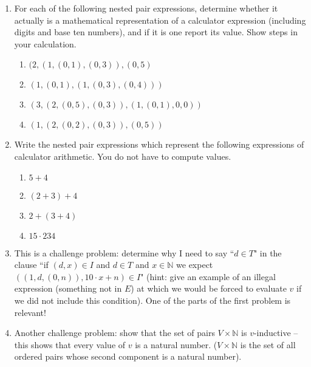 \documentclass[12pt]{book}
\begin{document}
\begin{description}
\begin{enumerate}

\item  For each of the following nested pair expressions, determine whether it actually is a mathematical representation of a calculator expression (including digits and base ten numbers), and if it is one report its value.
Show steps in your calculation.

\begin{enumerate}

\item  $(2,(1,(0,1),(0,3)),(0,5)$

\item  $(1,(0,1),(1,(0,3),(0,4)))$

\item  $(3,(2,(0,5),(0,3)),(1,(0,1),0,0))$

\item   $(1,(2,(0,2),(0,3)),(0,5))$


\end{enumerate}

\item Write the nested pair expressions which represent  the following expressions of calculator arithmetic.  You do not have to compute values.

\begin{enumerate}

\item $5+4$

\item $(2+3)+4$

\item $2+(3+4)$

\item $15 \cdot 234$


\end{enumerate}

\item This is a challenge problem:  determine why I need to say ``$d \in T$" in the clause ``if $(d,x) \in I$ and $d \in T$ and $x \in {\mathbb N}$ we expect $((1,d,(0,n)),10\cdot x+n) \in I$"
(hint:  give an example of an illegal expression (something not in $E$) at which we would be forced to evaluate $v$ if we did not include this condition).  One of the parts of the first problem is relevant!

\item Another challenge problem:  show that the set of pairs $V \times {\mathbb N}$ is $v$-inductive -- this shows that every value of $v$ is a natural number.  ($V \times {\mathbb N}$ is the set of all ordered pairs whose second component is a natural number).

\end{enumerate}


\end{description}
\end{document}
